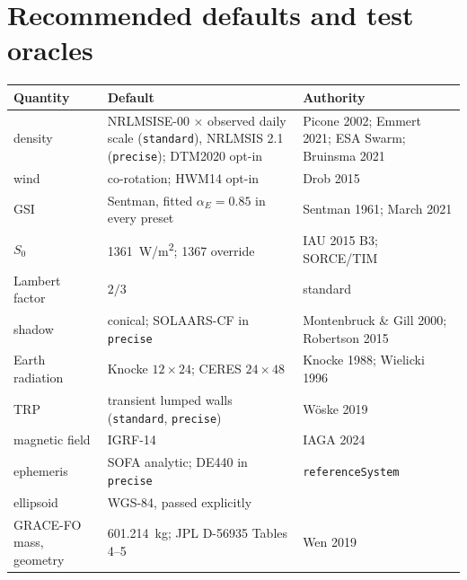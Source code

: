 \section{Recommended defaults and test oracles}
\begin{table}[h]\centering\footnotesize
\begin{tabular}{@{}lp{6.6cm}p{5cm}@{}}\toprule
Quantity & Default & Authority\\\midrule
density & NRLMSISE-00 $\times$ observed daily scale (\texttt{standard}), NRLMSIS 2.1 (\texttt{precise}); DTM2020 opt-in & Picone 2002; Emmert 2021; ESA Swarm; Bruinsma 2021\\
wind & co-rotation; HWM14 opt-in & Drob 2015\\
GSI & Sentman, fitted $\alpha_E=0.85$ in every preset & Sentman 1961; March 2021\\
$S_0$ & \SI{1361}{W/m^2}; 1367 override & IAU 2015 B3; SORCE/TIM\\
Lambert factor & $2/3$ & standard\\
shadow & conical; SOLAARS-CF in \texttt{precise} & Montenbruck \& Gill 2000; Robertson 2015\\
Earth radiation & Knocke $12\times24$; CERES $24\times48$ & Knocke 1988; Wielicki 1996\\
TRP & transient lumped walls (\texttt{standard}, \texttt{precise}) & Wöske 2019\\
magnetic field & IGRF-14 & IAGA 2024\\
ephemeris & SOFA analytic; DE440 in \texttt{precise} & \texttt{referenceSystem}\\
ellipsoid & WGS-84, passed explicitly & \\
GRACE-FO mass, geometry & \SI{601.214}{kg}; JPL D-56935 Tables 4--5 & Wen 2019\\\bottomrule
\end{tabular}
\end{table}
